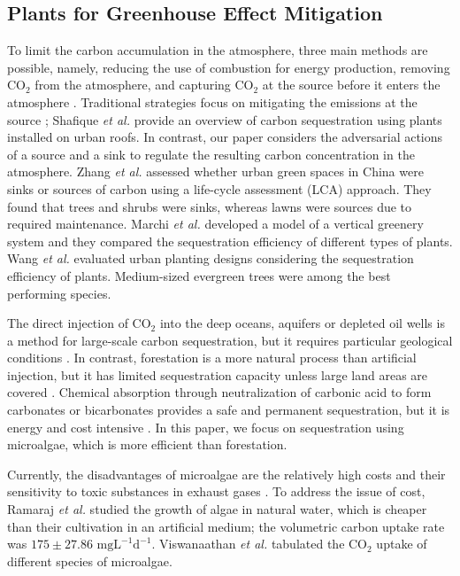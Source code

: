 \documentclass[lettersize,journal]{IEEEtran}
\begin{document}
\subsection{Plants for Greenhouse Effect Mitigation}
To limit the carbon accumulation in the atmosphere, three main methods are possible, namely, reducing the use of combustion for energy production, removing $\text{CO}_2$ from the atmosphere, and capturing $\text{CO}_2$ at the source before it enters the atmosphere \cite{benemann1997co2}. Traditional strategies focus on mitigating the emissions at the source \cite{shafique2020overview}; Shafique \textit{et al.} \cite{shafique2020overview} provide an overview of carbon sequestration using plants installed on urban roofs. In contrast, our paper considers the adversarial actions of a source and a sink to regulate the resulting carbon concentration in the atmosphere. Zhang \textit{et al.} \cite{zhang2022urban} assessed whether urban green spaces in China were sinks or sources of carbon using a life-cycle assessment (LCA) approach. They found that trees and shrubs were sinks, whereas lawns were sources due to required maintenance. Marchi \textit{et al.} \cite{marchi2015carbon} developed a model of a vertical greenery system and they compared the sequestration efficiency of different types of plants. Wang \textit{et al.} \cite{wang2021promoting} evaluated urban planting designs considering the sequestration efficiency of plants. Medium-sized evergreen trees were among the best performing species.    
    
The direct injection of $\text{CO}_2$ into the deep oceans, aquifers or depleted oil wells is a method for large-scale carbon sequestration, but it requires particular geological conditions \cite{zhou2017bio}. In contrast, forestation is a more natural process than artificial injection, but it has limited sequestration capacity unless large land areas are covered \cite{zhou2017bio}. Chemical absorption through neutralization of carbonic acid to form carbonates or bicarbonates provides a safe and permanent sequestration, but it is energy and cost intensive \cite{zhou2017bio}. In this paper, we focus on sequestration using microalgae, which is more efficient than forestation. 

Currently, the disadvantages of microalgae are the relatively high costs and their sensitivity to toxic substances in exhaust gases \cite{zhou2017bio}. To address the issue of cost, Ramaraj \textit{et al.} \cite{ramaraj2015biomass} studied the growth of algae in natural water, which is cheaper than their cultivation in an artificial medium; the volumetric carbon uptake rate was $175 \pm 27.86 \text{ mg}\text{L}^{-1}\text{d}^{-1}$. Viswanaathan \textit{et al.} \cite{viswanaathan2022integrated} tabulated the $\text{CO}_2$ uptake of different species of microalgae.  
\end{document}
